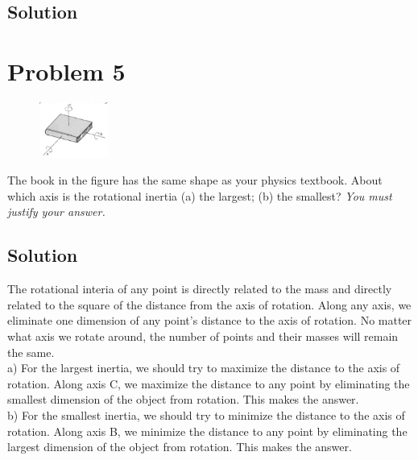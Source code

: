 \documentclass[12pt]{article}
\begin{document}
\subsection*{Solution}


\pagebreak
\section*{Problem 5}
\begin{figure}
    \vspace{-30pt}
    \includegraphics[width=0.20\textwidth]{graph_5.png} 
\end{figure}
The book in the figure has the same shape as your physics textbook. About which axis is the
rotational inertia (a) the largest; (b) the smallest? \textit{You must justify your answer.}

\subsection*{Solution}
The rotational interia of any point is directly related to the mass and directly related to the square of the distance from the axis of rotation. Along any axis, we eliminate one dimension of any point's distance to the axis of rotation. No matter what axis we rotate around, the number of points and their masses will remain the same.\\
a) For the largest inertia, we should try to maximize the distance to the axis of rotation. Along axis C, we maximize the distance to any point by eliminating the smallest dimension of the object from rotation. This makes  the answer.\\
b) For the smallest inertia, we should try to minimize the distance to the axis of rotation. Along axis B, we minimize the distance to any point by eliminating the largest dimension of the object from rotation. This makes  the answer.



\pagebreak
\end{document}
